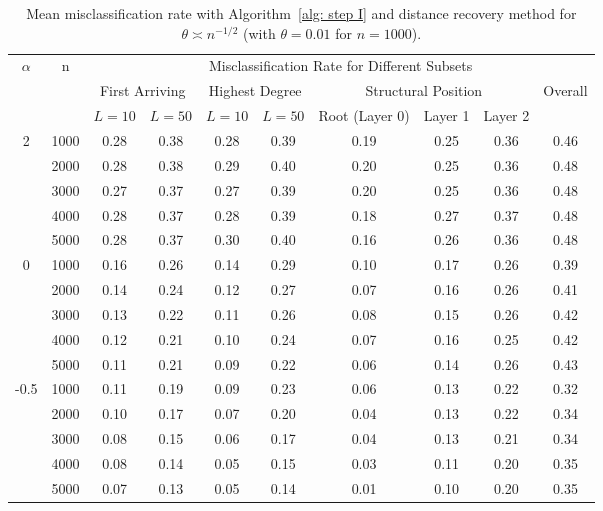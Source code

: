 \begin{table}[tbp]
\setlength{\tabcolsep}{3.5pt}

\centering

{
\begin{tabular}{c|c|cc|cc|ccc|c}
\hline
\hline
\multirow{3}{*}{$\alpha$} & \multirow{3}{*}{n}
& \multicolumn{8}{c}{Misclassification Rate for Different Subsets} \\
\cline{3-10}
& 
& \multicolumn{2}{c|}{First Arriving}
& \multicolumn{2}{c|}{Highest Degree}
& \multicolumn{3}{c|}{Structural Position}
& \multirow{2}{*}{Overall} \\
\cline{3-9}
& 
& $L=10$ & $L=50$
& $L=10$ & $L=50$
& Root (Layer 0) & Layer 1 & Layer 2
& \\
\hline
\multirow{5}{*}{2}
& 1000 & 0.28 & 0.38 & 0.28 & 0.39 & 0.19 & 0.25 & 0.36 & 0.46 \\
& 2000 & 0.28 & 0.38 & 0.29 & 0.40 & 0.20 & 0.25 & 0.36 & 0.48 \\
& 3000 & 0.27 & 0.37 & 0.27 & 0.39 & 0.20 & 0.25 & 0.36 & 0.48 \\
& 4000 & 0.28 & 0.37 & 0.28 & 0.39 & 0.18 & 0.27 & 0.37 & 0.48 \\
& 5000 & 0.28 & 0.37 & 0.30 & 0.40 & 0.16 & 0.26 & 0.36 & 0.48 \\
\hline
\multirow{5}{*}{0}
& 1000 & 0.16 & 0.26 & 0.14 & 0.29 & 0.10 & 0.17 & 0.26 & 0.39 \\
& 2000 & 0.14 & 0.24 & 0.12 & 0.27 & 0.07 & 0.16 & 0.26 & 0.41 \\
& 3000 & 0.13 & 0.22 & 0.11 & 0.26 & 0.08 & 0.15 & 0.26 & 0.42 \\
& 4000 & 0.12 & 0.21 & 0.10 & 0.24 & 0.07 & 0.16 & 0.25 & 0.42 \\
& 5000 & 0.11 & 0.21 & 0.09 & 0.22 & 0.06 & 0.14 & 0.26 & 0.43 \\
\hline
\multirow{5}{*}{-0.5}
& 1000 & 0.11 & 0.19 & 0.09 & 0.23 & 0.06 & 0.13 & 0.22 & 0.32 \\
& 2000 & 0.10 & 0.17 & 0.07 & 0.20 & 0.04 & 0.13 & 0.22 & 0.34 \\
& 3000 & 0.08 & 0.15 & 0.06 & 0.17 & 0.04 & 0.13 & 0.21 & 0.34 \\
& 4000 & 0.08 & 0.14 & 0.05 & 0.15 & 0.03 & 0.11 & 0.20 & 0.35 \\
& 5000 & 0.07 & 0.13 & 0.05 & 0.14 & 0.01 & 0.10 & 0.20 & 0.35 \\
\hline
\hline
\end{tabular}
}


\caption{Mean misclassification rate with Algorithm~\ref{alg: step I} and distance recovery method for $\theta \asymp n^{-1/2}$ (with $\theta=0.01$ for $n=1000$).}
\label{tab:mean_error_scale_n12}
\end{table}
